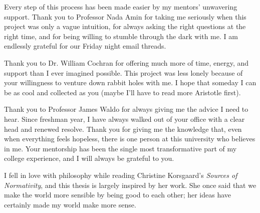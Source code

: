 %
\begin{isabellebody}%
%
%
\isadelimtheory
%
\endisadelimtheory
%
\isatagtheory
%
\endisatagtheory
{\isafoldtheory}%
%
\isadelimtheory
%
\endisadelimtheory
%
\begin{isamarkuptext}%
Every step of this process has been made easier by my mentors' unwavering support. Thank you to Professor 
Nada Amin for taking me seriously when this project was only a vague intuition, for always asking the 
right questions at the right time, and for being willing 
to stumble through the dark with me. I am endlessly grateful for our Friday night email threads.

Thank you to Dr. William Cochran for offering much more of time, energy, and support than I ever 
imagined possible. This project was less lonely because of your
willingness to venture down rabbit holes with me. I hope that someday I can be as cool and 
collected as you (maybe I'll have to read more Aristotle first).

Thank you to Professor James Waldo for always giving me the advice I need to hear. Since freshman year, 
I have always walked out of your office with a clear head and renewed resolve. Thank you for giving me the 
knowledge that, even when everything feels hopeless, there is one person at this university who believes in me.
Your mentorship has been the single most transformative part of my college experience, and I will always
be grateful to you.

I fell in love with philosophy while reading Christine Korsgaard's \emph{Sources of Normativity}, and 
this thesis is largely inspired by her work. She once said that 
we make the world more sensible by being good to each other; her ideas have certainly made my world make more
sense.%
\end{isamarkuptext}\isamarkuptrue%
%
\isadelimtheory
%
\endisadelimtheory
%
\isatagtheory
%
\endisatagtheory
{\isafoldtheory}%
%
\isadelimtheory
%
\endisadelimtheory
%
\end{isabellebody}%
\endinput
